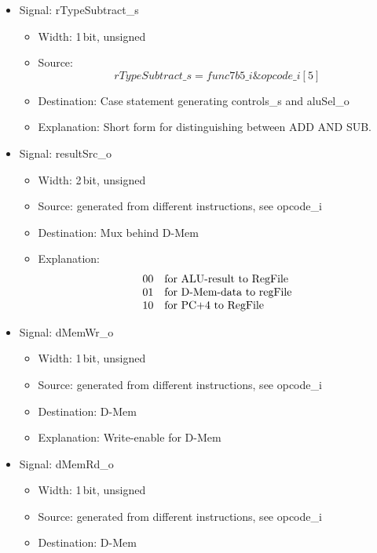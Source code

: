 \begin{itemize}
\begin{itemize}
  \end{itemize}
  \item Signal: rTypeSubtract\_s
  \begin{itemize}
    \item Width: 1\,bit, unsigned
    \item Source: \[ rTypeSubtract\_s = func7b5\_i \& opcode\_i[5] \]
    \item Destination: Case statement generating controls\_s and aluSel\_o
    \item Explanation: Short form for distinguishing between ADD AND SUB.
  \end{itemize}
  \item Signal: resultSrc\_o
  \begin{itemize}
    \item Width: 2\,bit, unsigned
    \item Source: generated from different instructions, see opcode\_i
    \item Destination: Mux behind D-Mem
    \item Explanation: 
                                        \[ \begin{array}{ll}
                                               $00$ & \mbox{for ALU-result to RegFile} \\
                                               $01$ & \mbox{for D-Mem-data to regFile} \\
                                               $10$ & \mbox{for PC+4 to RegFile}
                                            \end{array} \]
  \end{itemize}
  \item Signal: dMemWr\_o
  \begin{itemize}
    \item Width: 1\,bit, unsigned
    \item Source: generated from different instructions, see opcode\_i
    \item Destination: D-Mem
    \item Explanation: Write-enable for D-Mem
  \end{itemize}
  \item Signal: dMemRd\_o
  \begin{itemize}
    \item Width: 1\,bit, unsigned
    \item Source: generated from different instructions, see opcode\_i
    \item Destination: D-Mem

\end{itemize}
\end{itemize}
